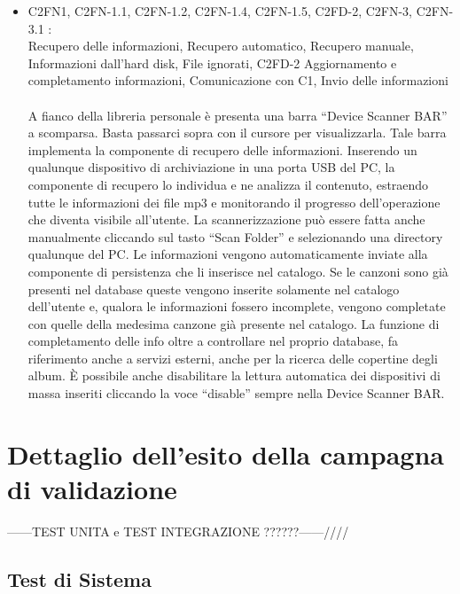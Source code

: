 \begin{itemize}
  \item C2FN1, C2FN-1.1, C2FN-1.2, C2FN-1.4, C2FN-1.5, C2FD-2, C2FN-3,
  C2FN-3.1 :\\
  Recupero delle informazioni, Recupero automatico, Recupero
  manuale, Informazioni dall'hard disk, File ignorati, C2FD-2 Aggiornamento e
  completamento informazioni, Comunicazione con C1, Invio delle informazioni\\
  \\A fianco della libreria personale \`e presenta una barra ``Device Scanner
  BAR'' a scomparsa. Basta passarci sopra con il cursore per visualizzarla. Tale
  barra implementa la componente di recupero delle informazioni. 
  Inserendo un qualunque dispositivo di archiviazione in una porta
  USB del PC, la componente di recupero lo individua e ne analizza il
  contenuto, estraendo tutte le informazioni dei file mp3 e monitorando il
  progresso dell'operazione che diventa visibile all'utente. La
  scannerizzazione pu\`o essere fatta anche manualmente cliccando sul tasto ``Scan Folder'' 
  e selezionando una directory qualunque del PC. Le informazioni vengono automaticamente inviate alla 
  componente di persistenza che li inserisce nel catalogo. Se le canzoni sono
  gi\`a presenti nel database queste vengono inserite solamente nel catalogo
  dell'utente e, qualora le informazioni fossero incomplete, vengono completate
  con quelle della medesima canzone gi\`a presente nel catalogo. La funzione di
  completamento delle info oltre a controllare nel proprio database, fa
  riferimento anche a servizi esterni, anche per la ricerca delle copertine
  degli album. \`E possibile anche disabilitare la lettura automatica dei
  dispositivi di massa inseriti cliccando la voce ``disable'' sempre nella Device Scanner BAR.
  
\end{itemize}


\section{Dettaglio dell'esito della campagna di validazione}
------TEST UNITA e TEST INTEGRAZIONE ??????------////

\subsection{Test di Sistema}

